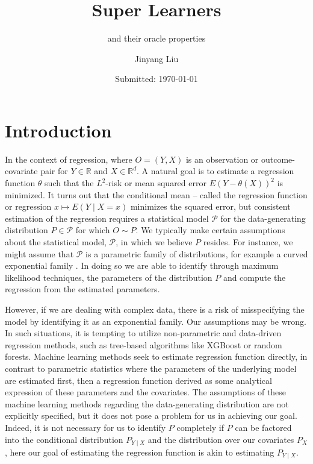 \documentclass[11pt, a4paper]{article}
\author{Jinyang Liu}
\title{Super Learners}
\subtitle{and their oracle properties}
\date{Submitted: \today}
\theoremstyle{definition}
\theoremstyle{remark}
\begin{document}
\begingroup
    \selectfont
    \maketitle
    \tableofcontents
    \newpage
\endgroup


\section{Introduction}
In the context of regression, where $ O = (Y, X) $ is an observation or outcome-covariate pair for $ Y \in \mathbb{R} $ and $ X \in \mathbb{R}^{d} $. A natural goal is to estimate a regression function $ \theta $ such that the $ L^2 $-risk or mean squared error $ E(Y - \theta(X))^2 $ is minimized. It turns out that the conditional mean -- called the regression function or regression $ x \mapsto E(Y \mid X = x) $ minimizes the squared error, but consistent estimation of the regression requires a statistical model $ \mathcal{P} $ for the data-generating distribution $ P \in \mathcal{P} $ for which $ O \sim P $. We typically make certain assumptions about the statistical model, $\mathcal{P}$, in which we believe $P$ resides. For instance, we might assume that $\mathcal{P}$ is a parametric family of distributions, for example a curved exponential family \parencite{lauritzen2023fundamentals}. In doing so we are able to identify through maximum likelihood techniques, the parameters of the distribution $ P $ and compute the regression from the estimated parameters.

However, if we are dealing with complex data, there is a risk of misspecifying the model by identifying it as an exponential family. Our assumptions may be wrong. In such situations, it is tempting to utilize non-parametric and data-driven regression methods, such as tree-based algorithms like XGBoost or random forests. Machine learning methods seek to estimate regression function directly, in contrast to parametric statistics where the parameters of the underlying model are estimated first, then a regression function derived as some analytical expression of these parameters and the covariates. The assumptions of these machine learning methods regarding the data-generating distribution are not explicitly specified, but it does not pose a problem for us in achieving our goal. Indeed, it is not necessary for us to identify $ P $ completely if $ P $ can be factored into the conditional distribution $ P_{Y \mid X} $ and the distribution over our covariates $ P_X $, here our goal of estimating the regression function is akin to estimating $ P_{Y \mid X} $.   
\end{document}
